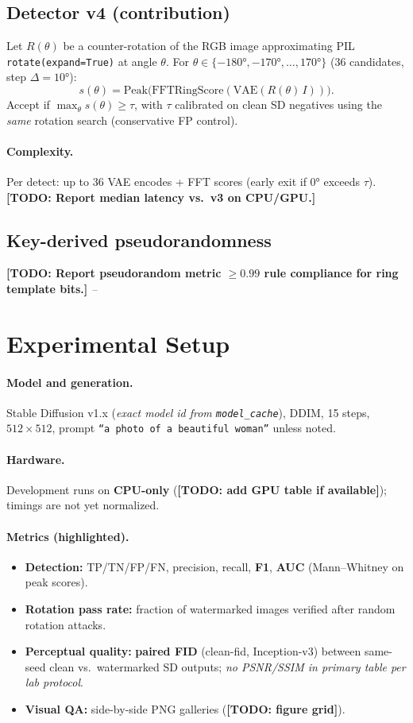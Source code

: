 \documentclass[11pt,a4paper]{article}
\newcommand{\placeholder}[1]{\textcolor{gray!70!black}{\textit{#1}}}
\newcommand{\todo}[1]{\textcolor{red!70!black}{\textbf{[TODO: #1]}}}
\begin{document}
\subsection{Detector v4 (contribution)}
Let $R(\theta)$ be a counter-rotation of the RGB image approximating PIL \texttt{rotate(expand=True)} at angle $\theta$.
For $\theta \in \{-180°,-170°,\ldots,170°\}$ (36 candidates, step $\Delta{=}10°$):
\[
  s(\theta) = \mathrm{Peak}\bigl(\mathrm{FFTRingScore}(\mathrm{VAE}(R(\theta)\,I))\bigr).
\]
Accept if $\max_\theta s(\theta) \ge \tau$, with $\tau$ calibrated on clean SD negatives using the \emph{same} rotation search (conservative FP control).

\paragraph{Complexity.}
Per detect: up to 36 VAE encodes + FFT scores (early exit if 0° exceeds $\tau$).
\todo{Report median latency vs.\ v3 on CPU/GPU.}

\subsection{Key-derived pseudorandomness}
\todo{Report pseudorandom metric $\ge 0.99$ rule compliance for ring template bits.}
\placeholder{--}

\section{Experimental Setup}

\paragraph{Model and generation.}
Stable Diffusion v1.x (\placeholder{exact model id from \texttt{model\_cache}}), DDIM, 15 steps, $512{\times}512$, prompt \texttt{``a photo of a beautiful woman''} unless noted.

\paragraph{Hardware.}
Development runs on \textbf{CPU-only} (\todo{add GPU table if available}); timings are not yet normalized.

\paragraph{Metrics (highlighted).}
\begin{itemize}[nosep]
  \item \textbf{Detection:} TP/TN/FP/FN, precision, recall, \textbf{F1}, \textbf{AUC} (Mann--Whitney on peak scores).
  \item \textbf{Rotation pass rate:} fraction of watermarked images verified after random rotation attacks.
  \item \textbf{Perceptual quality:} \textbf{paired FID} (clean-fid, Inception-v3) between same-seed clean vs.\ watermarked SD outputs; \placeholder{no PSNR/SSIM in primary table per lab protocol}.
  \item \textbf{Visual QA:} side-by-side PNG galleries (\todo{figure grid}).
\end{itemize}
\end{document}
